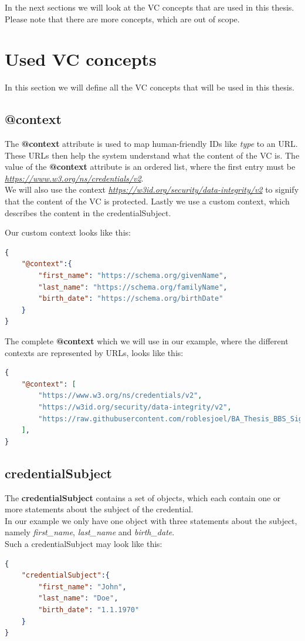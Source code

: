 \documentclass[
	a4paper               %
	,BCOR=0mm            %
	,bibliography=totoc   %
	,listof=totoc         %
	,monolingual
	,twoside=false
]{bfhthesis}              %
\begin{document}
In the next sections we will look at the VC concepts that are used in this thesis.
Please note that there are more concepts, which are out of scope.

\section{Used VC concepts}
\label{sec:usedvcconcepts}
In this section we will define all the VC concepts that will be used in this thesis.

\subsection{@context}
The \textbf{@context} attribute is used to map human-friendly IDs like \textit{type} to an URL.
These URLs then help the system understand what the content of the VC is.
The value of the \textbf{@context} attribute is an ordered list, where the first entry must be \textit{\url{https://www.w3.org/ns/credentials/v2}}.\\
We will also use the context \textit{\url{https://w3id.org/security/data-integrity/v2}} to signify that the content of the VC is protected.
Lastly we use a custom context, which describes the content in the credentialSubject.

Our custom context looks like this:
\begin{lstlisting}[language=json,firstnumber=1,caption={Example custom context},captionpos=b]
{
    "@context":{
        "first_name": "https://schema.org/givenName",
        "last_name": "https://schema.org/familyName",
		"birth_date": "https://schema.org/birthDate"
    }
}
\end{lstlisting}

The complete \textbf{@context} which we will use in our example, where the different contexts are represented by URLs, looks like this:
\begin{lstlisting}[language=json,firstnumber=1,caption={Example context},captionpos=b]
{
	"@context": [
		"https://www.w3.org/ns/credentials/v2",
		"https://w3id.org/security/data-integrity/v2",
		"https://raw.githubusercontent.com/roblesjoel/BA_Thesis_BBS_Signatures/docs/context/example_1.jsonld"
	],
}
\end{lstlisting}

\subsection{credentialSubject}
\label{subsub:credentialsubject}
The \textbf{credentialSubject} contains a set of objects, which each contain one or more statements about the subject of the credential.\\
In our example we only have one object with three statements about the subject, namely \textit{first\_name}, \textit{last\_name} and \textit{birth\_date}.\\
Such a credentialSubject may look like this:\newpage
\begin{lstlisting}[language=json,firstnumber=1,caption={Example credentialSubject},captionpos=b]
{
	"credentialSubject":{
		"first_name": "John",
		"last_name": "Doe",
		"birth_date": "1.1.1970"
	}
}
\end{lstlisting}
\end{document}
